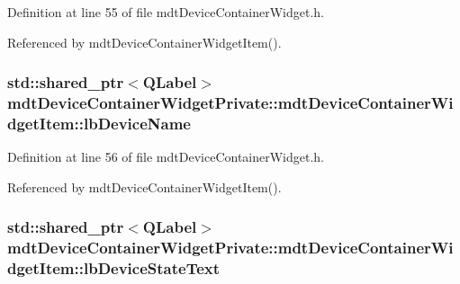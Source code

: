 Definition at line 55 of file mdt\-Device\-Container\-Widget.\-h.



Referenced by mdt\-Device\-Container\-Widget\-Item().

\hypertarget{classmdt_device_container_widget_private_1_1mdt_device_container_widget_item_a8233b97854de9e3b3c391d2f19f7320a}{
\subsubsection[{lb\-Device\-Name}]{\setlength{\rightskip}{0pt plus 5cm}std\-::shared\-\_\-ptr$<$Q\-Label$>$ mdt\-Device\-Container\-Widget\-Private\-::mdt\-Device\-Container\-Widget\-Item\-::lb\-Device\-Name}}\label{classmdt_device_container_widget_private_1_1mdt_device_container_widget_item_a8233b97854de9e3b3c391d2f19f7320a}


Definition at line 56 of file mdt\-Device\-Container\-Widget.\-h.



Referenced by mdt\-Device\-Container\-Widget\-Item().

\hypertarget{classmdt_device_container_widget_private_1_1mdt_device_container_widget_item_a90e0b939fb6e476fc2d17e620d2f6ed6}{
\subsubsection[{lb\-Device\-State\-Text}]{\setlength{\rightskip}{0pt plus 5cm}std\-::shared\-\_\-ptr$<$Q\-Label$>$ mdt\-Device\-Container\-Widget\-Private\-::mdt\-Device\-Container\-Widget\-Item\-::lb\-Device\-State\-Text}}\label{classmdt_device_container_widget_private_1_1mdt_device_container_widget_item_a90e0b939fb6e476fc2d17e620d2f6ed6}


